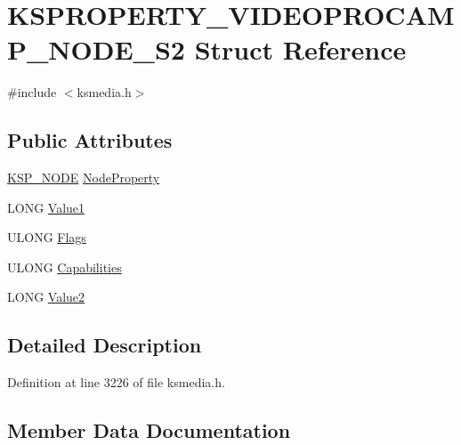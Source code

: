 \hypertarget{struct_k_s_p_r_o_p_e_r_t_y___v_i_d_e_o_p_r_o_c_a_m_p___n_o_d_e___s2}{}\section{K\+S\+P\+R\+O\+P\+E\+R\+T\+Y\+\_\+\+V\+I\+D\+E\+O\+P\+R\+O\+C\+A\+M\+P\+\_\+\+N\+O\+D\+E\+\_\+\+S2 Struct Reference}
\label{struct_k_s_p_r_o_p_e_r_t_y___v_i_d_e_o_p_r_o_c_a_m_p___n_o_d_e___s2}


{\ttfamily \#include $<$ksmedia.\+h$>$}

\subsection*{Public Attributes}
\begin{DoxyCompactItemize}
\item 
\hyperlink{struct_k_s_p___n_o_d_e}{K\+S\+P\+\_\+\+N\+O\+DE} \hyperlink{struct_k_s_p_r_o_p_e_r_t_y___v_i_d_e_o_p_r_o_c_a_m_p___n_o_d_e___s2_a45656c6f05c44c065bcc8e2dae91b94a}{Node\+Property}
\item 
L\+O\+NG \hyperlink{struct_k_s_p_r_o_p_e_r_t_y___v_i_d_e_o_p_r_o_c_a_m_p___n_o_d_e___s2_ab78f724c54039caa03e8f2e73a5bbe37}{Value1}
\item 
U\+L\+O\+NG \hyperlink{struct_k_s_p_r_o_p_e_r_t_y___v_i_d_e_o_p_r_o_c_a_m_p___n_o_d_e___s2_a1eb8ef788642f0d2e33875c899c8d2ff}{Flags}
\item 
U\+L\+O\+NG \hyperlink{struct_k_s_p_r_o_p_e_r_t_y___v_i_d_e_o_p_r_o_c_a_m_p___n_o_d_e___s2_a35fe123a9d208613eb8774bcedf98847}{Capabilities}
\item 
L\+O\+NG \hyperlink{struct_k_s_p_r_o_p_e_r_t_y___v_i_d_e_o_p_r_o_c_a_m_p___n_o_d_e___s2_afd9cec1b857cbc9fcfc35fe462c5c2ab}{Value2}
\end{DoxyCompactItemize}


\subsection{Detailed Description}


Definition at line 3226 of file ksmedia.\+h.



\subsection{Member Data Documentation}
